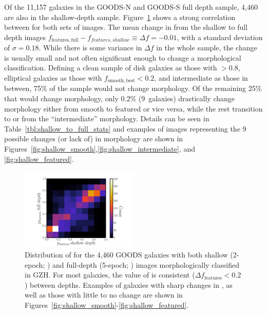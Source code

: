 \documentclass[a4paper,fleqn,usenatbib]{mnras}
\begin{document}
Of the 11,157 galaxies in the GOODS-N and GOODS-S full depth sample, 4,460
are also in the shallow-depth sample. Figure~\ref{fig:shallow_vs_full} shows a
strong correlation between \ffeatures{} for both sets of images. The mean
change in \ffeatures{} from the shallow to full depth images
$f_\mathrm{features,full} - f_{features,shallow} \equiv \Delta f = -0.01$, with
a standard deviation of $\sigma = 0.18$. While there is some variance in
$\Delta f$ in the whole sample, the change is usually small and not often
significant enough to change a morphological classification. Defining a clean
sample of disk galaxies as those with \fbest$>0.8$, elliptical galaxies as
those with $f_\mathrm{smooth,best}<0.2$, and intermediate as those in between,
75\% of the sample would not change morphology. Of the remaining 25\% that
would change morphology, only 0.2\% (9~galaxies)
drastically change morphology either from smooth to featured or vice versa, while the
rest transition to or from the ``intermediate'' morphology. Details can
be seen in Table~\ref{tbl:shallow_to_full_stats} and examples of images
representing the 9 possible changes (or lack of) in morphology are shown in
Figures~\ref{fig:shallow_smooth},\ref{fig:shallow_intermediate}, and
\ref{fig:shallow_featured}.

\begin{figure}
\begin{center}
\includegraphics[width=0.50\textwidth]{figures/full_shallow_p_plot.pdf}
\caption{Distribution of \ffeatures{} for the 4,460 GOODS galaxies with both
shallow (2-epoch; \goods) and full-depth (5-epoch; \main) images
morphologically classified in GZH. For most galaxies, the value of \ffeatures{}
is consistent ($\Delta f_\mathrm{features}<0.2$) between depths. Examples of
galaxies with sharp changes in \ffeatures, as well as those with little to no
change are shown in
Figures~\ref{fig:shallow_smooth}-\ref{fig:shallow_featured}.}
\label{fig:shallow_vs_full}
\end{center}
\end{figure}
\end{document}
